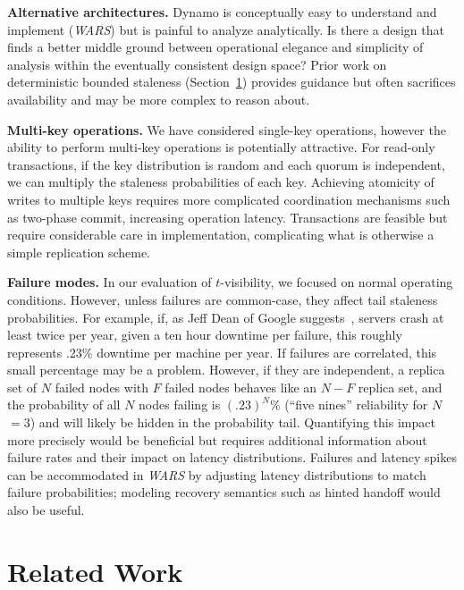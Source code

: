 \documentclass{vldb}
\newcommand{\sectionskip}{-0em}
\begin{document}
\textbf{Alternative architectures.} Dynamo is conceptually easy to
understand and implement (\textit{WARS}) but is painful to analyze
analytically.  Is there a design that finds a better middle ground
between operational elegance and simplicity of analysis within the
eventually consistent design space?  Prior work on deterministic
bounded staleness (Section~\ref{sec:relatedwork}) provides guidance
but often sacrifices availability and may be more complex to reason
about.

\textbf{Multi-key operations.} We have considered single-key
operations, however the ability to perform multi-key operations is
potentially attractive.  For read-only transactions, if the key
distribution is random and each quorum is independent, we can multiply
the staleness probabilities of each key.  Achieving atomicity of
writes to multiple keys requires more complicated coordination
mechanisms such as two-phase commit, increasing operation latency.
Transactions are feasible but require considerable care in
implementation, complicating what is otherwise a simple replication
scheme.

\textbf{Failure modes.} In our evaluation of $t$-visibility, we
focused on normal operating conditions. However, unless failures are
common-case, they affect tail staleness probabilities.  For example,
if, as Jeff Dean of Google suggests~\cite{dean-keynote}, servers crash
at least twice per year, given a ten hour downtime per failure, this
roughly represents .23\% downtime per machine per year.  If failures
are correlated, this small percentage may be a problem. However, if
they are independent, a replica set of $N$ failed nodes with $F$
failed nodes behaves like an $N-F$ replica set, and the probability of
all $N$ nodes failing is $(.23)^N$\% (``five nines'' reliability for
$N$$=$$3$) and will likely be hidden in the probability tail.
Quantifying this impact more precisely would be beneficial but
requires additional information about failure rates and their impact
on latency distributions. Failures and latency spikes can be
accommodated in \textit{WARS} by adjusting latency distributions to
match failure probabilities; modeling recovery semantics such as
hinted handoff would also be useful.

\vspace{\sectionskip}\section{Related Work}
\label{sec:relatedwork}
\end{document}
